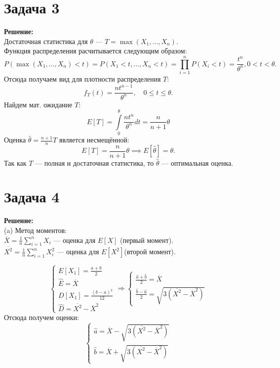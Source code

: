 \documentclass{article}
\begin{document}
\section*{Задача 3}

\noindent \textbf{Решение:} \\
Достаточная статистика для \(\theta\) — \(T = \max(X_1, ..., X_n)\). \\
Функция распределения расчитывается следующим образом:
\[
  P(\max(X_1, \ldots, X_n) < t) = P(X_{1} < t, \ldots, X_{n} < t) = \prod\limits_{i=1}^{n}P(X_{i}<t) = \frac{t^{n}}{\theta^{n}},
  0<t<\theta.
\]
Отсюда получаем вид для плотности распределения \(T\):
\[
f_T(t) = \frac{n t^{n-1}}{\theta^n}, \quad 0 \leq t \leq \theta.
\]
Найдем мат. ожидание $T$:
\[
E[T] = \int\limits_{0}^{\theta}\frac{n t^{n}}{\theta^n}dt = \frac{n}{n+1}\theta
\]
Оценка \(\hat{\theta} = \frac{n+1}{n} T\) является несмещённой:
\[
E[T] = \frac{n}{n+1} \theta \implies E[\hat{\theta}] = \theta.
\]
Так как \(T\) — полная и достаточная статистика, то \(\hat{\theta}\) — оптимальная оценка.

\section*{Задача 4}
\noindent \textbf{Решение:} \\
(a) Метод моментов: \\
$\overline{X} = \frac 1 n \sum\limits_{i=1}^{n}X_{i}$ --- оценка для $E[X]$ (первый момент).\\
$\overline{X^{2}} = \frac 1 n \sum\limits_{i=1}^{n}X_{i}^{2}$ --- оценка для $E\left[X^{2}\right]$(второй момент).

\[
\begin{cases}
  E[X_1] = \frac{a + b}2\\
  \widehat{E} = \overline{X}\\
  D[X_{1}] = \frac{{(b-a)}^{2}}{12}\\
  \widehat{D} = \overline{X^{2}} - \overline{X}^{2}
\end{cases}
\Rightarrow
\begin{cases}
  \frac{\hat{a} + \hat{b}}2 = \overline{X}\\
  \frac{\hat{b} - \hat{a}}2 = \sqrt{3\left(\overline{X^{2}} - \overline{X}^{2}\right)}
\end{cases}
\]
Отсюда получем оценки:
\[
  \begin{cases}
    \hat{a} = \overline{X} - \sqrt{3\left(\overline{X^{2}} - \overline{X}^{2}\right)}\\
    \hat{b} = \overline{X} + \sqrt{3\left(\overline{X^{2}} - \overline{X}^{2}\right)}
  \end{cases}
\]
\end{document}
